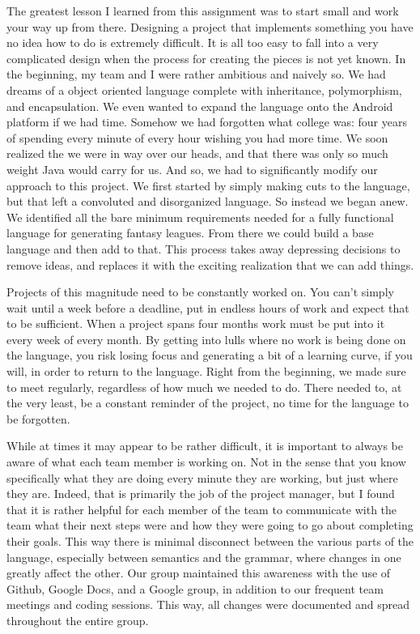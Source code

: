 \documentclass[12pt]{report}
\begin{document}
The greatest lesson I learned from this assignment was to start small and work your way up from there. Designing a project that implements something you have no idea how to do is extremely difficult. It is all too easy to fall into a very complicated design when the process for creating the pieces is not yet known. In the beginning, my team and I were rather ambitious and naively so. We had dreams of a object oriented language complete with inheritance, polymorphism, and encapsulation. We even wanted to expand the language onto the Android platform if we had time. Somehow we had forgotten what college was: four years of spending every minute of every hour wishing you had more time. We soon realized the we were in way over our heads, and that there was only so much weight Java would carry for us. And so, we had to significantly modify our approach to this project. We first started by simply making cuts to the language, but that left a convoluted and disorganized language. So instead we began anew. We identified all the bare minimum requirements needed for a fully functional language for generating fantasy leagues. From there we could build a base language and then add to that. This process takes away depressing decisions to remove ideas, and replaces it with the exciting realization that we can add things.

Projects of this magnitude need to be constantly worked on. You can’t simply wait until a week before a deadline, put in endless hours of work and expect that to be sufficient. When a project spans four months work must be put into it every week of every month. By getting into lulls where no work is being done on the language, you risk losing focus and generating a bit of a learning curve, if you will, in order to return to the language. Right from the beginning, we made sure to meet regularly, regardless of how much we needed to do. There needed to, at the very least, be a constant reminder of the project, no time for the language to be forgotten.

While at times it may appear to be rather difficult, it is important to always be aware of what each team member is working on. Not in the sense that you know specifically what they are doing every minute they are working, but just where they are. Indeed, that is primarily the job of the project manager, but I found that it is rather helpful for each member of the team to communicate with the team what their next steps were and how they were going to go about completing their goals. This way there is minimal disconnect between the various parts of the language, especially between semantics and the grammar, where changes in one greatly affect the other. Our group maintained this awareness with the use of Github, Google Docs, and a Google group, in addition to our frequent team meetings and coding sessions. This way, all changes were documented and spread throughout the entire group.
\end{document}
